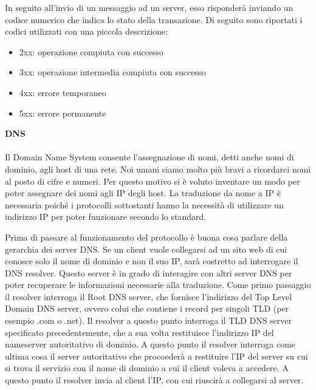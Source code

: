 \documentclass[12pt]{report}
\begin{document}
In seguito all'invio di un messaggio ad un server, esso risponderà inviando un codice numerico che indica lo stato della transazione. Di seguito sono riportati i codici utilizzati con una piccola descrizione:
\begin{itemize}
    \item 2xx: operazione compiuta con successo
    \item 3xx: operazione intermedia compiuta con successo
    \item 4xx: errore temporaneo
    \item 5xx: errore permanente
\end{itemize}

\noindent
\textbf{DNS}
\\\\
Il Domain Name System consente l'assegnazione di nomi, detti anche nomi di dominio, agli host di una rete. 
Noi umani siamo molto più bravi a ricordarci nomi al posto di cifre e numeri. Per questo motivo si è voluto inventare un modo per poter assegnare dei nomi agli IP degli host. La traduzione da nome a IP è necessaria poiché i protocolli sottostanti hanno la necessità di utilizzare un indirizzo IP per poter funzionare secondo lo standard.\cite{rfcDNS}

Prima di passare al funzionamento del protocollo è buona cosa parlare della gerarchia dei server DNS. Se un client vuole collegarsi ad un sito web di cui conosce solo il nome di dominio e non il suo IP, sarà costretto ad interrogare il DNS resolver. Questo server è in grado di interagire con altri server DNS per poter recuperare le informazioni necessarie alla traduzione. Come primo passaggio il resolver interroga il Root DNS server, che fornisce l'indirizzo del Top Level Domain DNS server, ovvero colui che contiene i record per singoli TLD (per esempio .com o .net). Il resolver a questo punto interroga il TLD DNS server specificato precedentemente, che a sua volta restituisce l'indirizzo IP del nameserver autoritativo di dominio. A questo punto il resolver interroga come ultima cosa il server autoritativo che procoederà a restituire l'IP del server su cui si trova il servizio con il nome di dominio a cui il client voleva a accedere. A questo punto il resolver invia al client l'IP, con cui riuscirà a collegarsi al server.\cite{cloudflareDNS}
\end{document}
